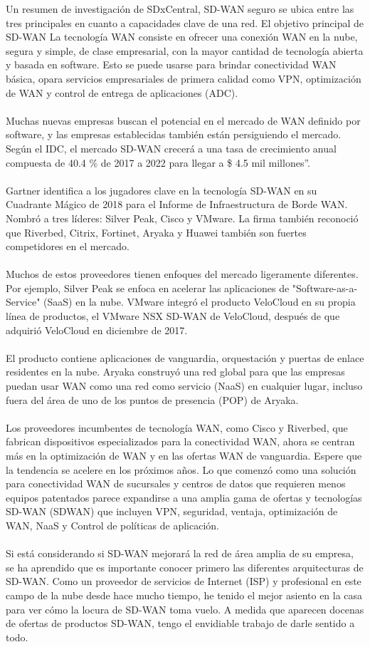 Un resumen de investigación de SDxCentral, SD-WAN seguro se ubica entre las tres principales en cuanto a capacidades clave de una red.
El objetivo principal de SD-WAN La tecnología WAN consiste en ofrecer una conexión WAN en la nube, segura y simple, de clase empresarial, con la mayor cantidad de tecnología abierta y basada en software.
Esto se puede usarse para brindar conectividad WAN básica, opara servicios empresariales de primera calidad como VPN, optimización de WAN y control de entrega de aplicaciones (ADC).
\\
\\
Muchas nuevas empresas buscan el potencial en el mercado de WAN definido por software, y las empresas establecidas también están persiguiendo el mercado. Según el IDC, el mercado SD-WAN crecerá a una tasa de crecimiento anual compuesta de 40.4 \% de 2017 a 2022 para llegar a \$ 4.5 mil millones”.
\\
\\
Gartner identifica a los jugadores clave en la tecnología SD-WAN en su Cuadrante Mágico de 2018 para el Informe de Infraestructura de Borde WAN. Nombró a tres líderes: Silver Peak, Cisco y VMware. La firma también reconoció que Riverbed, Citrix, Fortinet, Aryaka y Huawei también son fuertes competidores en el mercado.
\\
\\
Muchos de estos proveedores tienen enfoques del mercado ligeramente diferentes. Por ejemplo, Silver Peak se enfoca en acelerar las aplicaciones de "Software-as-a-Service" (SaaS) en la nube. VMware integró el producto VeloCloud en su propia línea de productos, el VMware NSX SD-WAN de VeloCloud, después de que adquirió VeloCloud
en diciembre de 2017.
\\
\\
El producto contiene aplicaciones de vanguardia, orquestación y puertas de enlace residentes en la nube. Aryaka construyó una red global para que las empresas puedan usar WAN como una red como servicio (NaaS) en cualquier lugar, incluso fuera del área de uno de los puntos de presencia (POP) de Aryaka.
\\
\\
Los proveedores incumbentes de tecnología WAN, como Cisco y Riverbed, que fabrican dispositivos especializados para la conectividad WAN, ahora se centran más en la optimización de WAN y en las ofertas WAN de vanguardia.
Espere que la tendencia se acelere en los próximos años. Lo que comenzó como una
solución para conectividad WAN de sucursales y centros de datos que requieren menos equipos patentados parece expandirse a una amplia gama de ofertas y tecnologías SD-WAN (SDWAN) que incluyen VPN, seguridad, ventaja, optimización de WAN, NaaS y Control de políticas de aplicación.
\\
\\
Si está considerando si SD-WAN mejorará la red de área amplia de su empresa, se ha aprendido que es importante conocer primero las diferentes arquitecturas de SD-WAN.
Como un proveedor de servicios de Internet (ISP) y profesional en este campo  de la nube desde hace
mucho tiempo, he tenido el mejor asiento en la casa para ver cómo la locura de SD-WAN toma vuelo. A medida que aparecen docenas de ofertas de productos SD-WAN, tengo el envidiable trabajo de darle sentido a todo.
